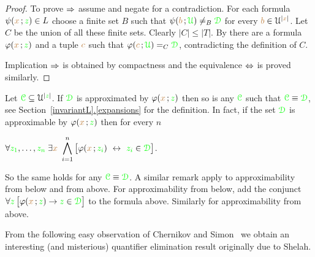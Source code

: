 \documentclass[creche.tex]{subfiles}
\begin{document}
\begin{proof}
To prove $\Rightarrow$ assume  and negate  for a contradiction.
For each formula $\psi({\color{brown} x}\,;{\color{green} z})\in L$ choose a finite set $B$ such that $\psi({\color{brown} b}\,;{\color{green}\EuScript U})\neq_B{\color{green}\EuScript D}$ for every ${\color{brown} b}\in\EuScript U^{|{\color{brown} x}|}$.
Let $C$ be the union of all these finite sets.
Clearly $|C|\le|T|$.
By  there are a formula $\varphi({\color{brown} x}\,;{\color{green} z})$ and a tuple ${\color{brown} c}$ such that $\varphi({\color{brown} c}\,;{\color{green}\EuScript U})=_C{\color{green}\EuScript D}$, contradicting the definition of $C$.

Implication $\Rightarrow$ is obtained by compactness and the equivalence $\Leftrightarrow$ is proved similarly.
\end{proof}



\begin{remark}\label{prop_approx_el_eq}
Let ${\color{green}\EuScript C}\subseteq\EuScript U^{|{\color{green} z}|}$.
If ${\color{green}\EuScript D}$ is approximated by $\varphi({\color{brown} x}\,;{\color{green} z})$ then so is any ${\color{green}\EuScript C}$ such that ${\color{green}\EuScript C}\equiv{\color{green}\EuScript D}$, see Section~\hyperref[expansions]{\ref*{invariantL}.\ref*{expansions}} for the definition.
In fact, if the set ${\color{green}\EuScript D}$ is approximable by $\varphi({\color{brown} x}\,;{\color{green} z})$ then for every $n$

\hfil$\displaystyle\A {\gr z_1},\dots,{\gr z_n}\;\E {\mr x}\ \bigwedge^n_{i=1}\big[\phi({\mr x}\,;{\gr z_i})\ \iff\ {\gr z_i}\in{\gr \D}\big]$.


So the same holds for any ${\color{green}\EuScript C}\equiv{\color{green}\EuScript D}$.
A similar remark apply to approximability from below and from above.
For approximability from below, add the conjunct $\forall {\color{green}z}\,\big[\varphi({\color{brown} x}\,;{\color{green} z})\rightarrow {\color{green}z}\in{\color{green}\EuScript D}\big]$ to the formula above.
Similarly for approximability from above.\QED
\end{remark}

From the following easy observation of Chernikov and Simon~\cite{CS} we obtain an interesting (and misterious) quantifier elimination result originally due to Shelah.
\end{document}
